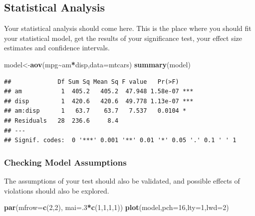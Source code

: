 \documentclass[
]{article}
\newenvironment{Shaded}{\begin{snugshade}}{\end{snugshade}}
\newcommand{\AttributeTok}[1]{\textcolor[rgb]{0.13,0.29,0.53}{#1}}
\newcommand{\DecValTok}[1]{\textcolor[rgb]{0.00,0.00,0.81}{#1}}
\newcommand{\FunctionTok}[1]{\textcolor[rgb]{0.13,0.29,0.53}{\textbf{#1}}}
\newcommand{\NormalTok}[1]{#1}
\newcommand{\OtherTok}[1]{\textcolor[rgb]{0.56,0.35,0.01}{#1}}
\newcommand{\SpecialCharTok}[1]{\textcolor[rgb]{0.81,0.36,0.00}{\textbf{#1}}}
\begin{document}
\subsection{Statistical Analysis}\label{statistical-analysis}

Your statistical analysis should come here. This is the place where you
should fit your statistical model, get the results of your significance
test, your effect size estimates and confidence intervals.

\begin{Shaded}
\begin{Highlighting}[]
\NormalTok{model}\OtherTok{\textless{}{-}}\FunctionTok{aov}\NormalTok{(mpg}\SpecialCharTok{\textasciitilde{}}\NormalTok{am}\SpecialCharTok{*}\NormalTok{disp,}\AttributeTok{data=}\NormalTok{mtcars)}
\FunctionTok{summary}\NormalTok{(model)}
\end{Highlighting}
\end{Shaded}

\begin{verbatim}
##             Df Sum Sq Mean Sq F value   Pr(>F)    
## am           1  405.2   405.2  47.948 1.58e-07 ***
## disp         1  420.6   420.6  49.778 1.13e-07 ***
## am:disp      1   63.7    63.7   7.537   0.0104 *  
## Residuals   28  236.6     8.4                     
## ---
## Signif. codes:  0 '***' 0.001 '**' 0.01 '*' 0.05 '.' 0.1 ' ' 1
\end{verbatim}

\subsubsection{Checking Model
Assumptions}\label{checking-model-assumptions}

The assumptions of your test should also be validated, and possible
effects of violations should also be explored.

\begin{Shaded}
\begin{Highlighting}[]
\FunctionTok{par}\NormalTok{(}\AttributeTok{mfrow=}\FunctionTok{c}\NormalTok{(}\DecValTok{2}\NormalTok{,}\DecValTok{2}\NormalTok{), }\AttributeTok{mai=}\NormalTok{.}\DecValTok{3}\SpecialCharTok{*}\FunctionTok{c}\NormalTok{(}\DecValTok{1}\NormalTok{,}\DecValTok{1}\NormalTok{,}\DecValTok{1}\NormalTok{,}\DecValTok{1}\NormalTok{))}
\FunctionTok{plot}\NormalTok{(model,}\AttributeTok{pch=}\DecValTok{16}\NormalTok{,}\AttributeTok{lty=}\DecValTok{1}\NormalTok{,}\AttributeTok{lwd=}\DecValTok{2}\NormalTok{)}
\end{Highlighting}
\end{Shaded}
\end{document}
